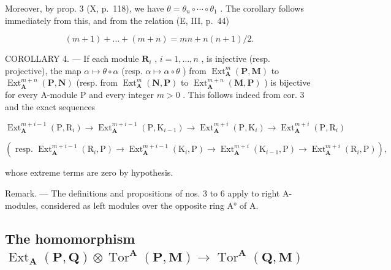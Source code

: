 Moreover, by prop. 3 (X, p.~118), we have \(\theta = \theta_{n} \circ \cdots \circ \theta_{1}\) . The corollary follows immediately from this, and from the relation (E, III, p.~44)

\[
(m + 1) + \dots + (m + n) = m n + n (n + 1) / 2.
\]

COROLLARY 4. --- If each module \(\mathbf{R}_i\) , \(i = 1, \ldots, n\) , is injective (resp. projective), the map \(\alpha \mapsto \theta \circ \alpha\) (resp. \(\alpha \mapsto \alpha \circ \theta\) ) from \(\operatorname{Ext}_{\mathbf{A}}^{m}(\mathbf{P}, \mathbf{M})\) to \(\operatorname{Ext}_{\mathbf{A}}^{m+n}(\mathbf{P}, \mathbf{N})\) (resp. from \(\operatorname{Ext}_{\mathbf{A}}^{m}(\mathbf{N}, \mathbf{P})\) to \(\operatorname{Ext}_{\mathbf{A}}^{m+n}(\mathbf{M}, \mathbf{P})\) ) is bijective for every A-module P and every integer \(m > 0\) . This follows indeed from cor. 3 and the exact sequences

\[
\operatorname{Ext} _ {\mathbf {A}} ^ {m + i - 1} \left(\mathrm{P}, \mathrm{R} _ {i}\right)\rightarrow \operatorname{Ext} _ {\mathbf {A}} ^ {m + i - 1} \left(\mathrm{P}, \mathrm{K} _ {i - 1}\right)\rightarrow \operatorname{Ext} _ {\mathbf {A}} ^ {m + i} \left(\mathrm{P}, \mathrm{K} _ {i}\right)\rightarrow \operatorname{Ext} _ {\mathbf {A}} ^ {m + i} \left(\mathrm{P}, \mathrm{R} _ {i}\right)
\]

\[
\left(\text { resp. } \operatorname{Ext} _ {\mathbf {A}} ^ {m + i - 1} \left(\mathrm{R} _ {i}, \mathrm{P}\right)\rightarrow \operatorname{Ext} _ {\mathbf {A}} ^ {m + i - 1} \left(\mathrm{K} _ {i}, \mathrm{P}\right)\rightarrow \operatorname{Ext} _ {\mathbf {A}} ^ {m + i} \left(\mathrm{K} _ {i - 1}, \mathrm{P}\right)\rightarrow \operatorname{Ext} _ {\mathbf {A}} ^ {m + i} \left(\mathrm{R} _ {i}, \mathrm{P}\right)\right),
\]

whose extreme terms are zero by hypothesis.

Remark. --- The definitions and propositions of nos. 3 to 6 apply to right A-modules, considered as left modules over the opposite ring A° of A.

\subsection{\texorpdfstring{The homomorphism \(\operatorname{Ext}_{\mathbf{A}}(\mathbf{P}, \mathbf{Q}) \otimes \operatorname{Tor}^{\mathbf{A}}(\mathbf{P}, \mathbf{M}) \to \operatorname{Tor}^{\mathbf{A}}(\mathbf{Q}, \mathbf{M})\)}{The homomorphism \textbackslash operatorname\{Ext\}\_\{\textbackslash mathbf\{A\}\}(\textbackslash mathbf\{P\}, \textbackslash mathbf\{Q\}) \textbackslash otimes \textbackslash operatorname\{Tor\}\^{}\{\textbackslash mathbf\{A\}\}(\textbackslash mathbf\{P\}, \textbackslash mathbf\{M\}) \textbackslash to \textbackslash operatorname\{Tor\}\^{}\{\textbackslash mathbf\{A\}\}(\textbackslash mathbf\{Q\}, \textbackslash mathbf\{M\})}}

